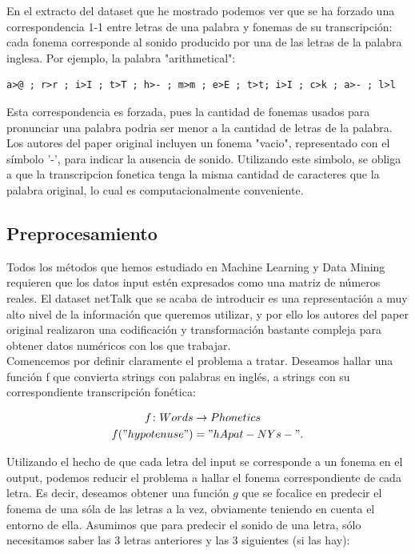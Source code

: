 \documentclass[paper=a4, fontsize=11pt]{scrartcl} %
\numberwithin{equation}{section} %
\numberwithin{figure}{section} %
\numberwithin{table}{section} %
\begin{document}
En el extracto del dataset que he mostrado podemos ver que se ha forzado una correspondencia 1-1 entre letras de una palabra y fonemas de su transcripción: cada fonema corresponde al sonido producido por una de las letras de la palabra inglesa. Por ejemplo, la palabra "arithmetical": 

\begin{center}

\begin{BVerbatim}
a>@ ; r>r ; i>I ; t>T ; h>- ; m>m ; e>E ; t>t; i>I ; c>k ; a>- ; l>l               
\end{BVerbatim}

\end{center}

Esta correspondencia es forzada, pues la cantidad de fonemas usados para pronunciar una palabra podria ser menor a la cantidad de letras de la palabra. Los autores del paper original incluyen un fonema "vacio", representado con el símbolo '-', para indicar la ausencia de sonido. Utilizando este simbolo, se obliga a que la transcripcion fonetica tenga la misma cantidad de caracteres que la palabra original, lo cual es computacionalmente conveniente.



\subsection{Preprocesamiento}

Todos los métodos que hemos estudiado en Machine Learning y Data Mining requieren que los datos input estén  expresados como una matriz de números reales. El dataset netTalk que se acaba de introducir es una representación a muy alto nivel de la información que queremos utilizar, y por ello los autores del paper original realizaron una codificación y transformación bastante compleja para obtener datos numéricos con los que trabajar. \\

Comencemos por definir claramente el problema a tratar. Deseamos hallar una función f que convierta strings con palabras en inglés, a strings con su correspondiente transcripción fonética:

\begin{align*}
  f \colon Words &\to Phonetics \\
  f("hypotenuse") &= "hApat-NYs-".
\end{align*}

Utilizando el hecho de que cada letra del input se corresponde a un fonema en el output, podemos reducir el problema a hallar el fonema correspondiente de cada letra. Es decir, deseamos obtener una función $g$ que se focalice en predecir el fonema de una sóla de las letras a la vez, obviamente teniendo en cuenta el entorno de ella. Asumimos que para predecir el sonido de una letra, sólo necesitamos saber las 3 letras anteriores y las 3 siguientes (si las hay):
\end{document}
